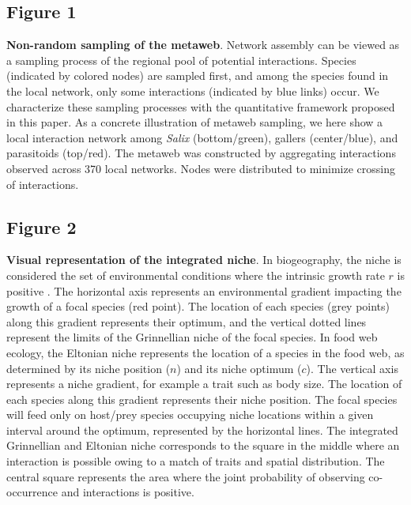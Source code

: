 \documentclass[12pt]{article}
\begin{document}
\subsection*{Figure 1}

\textbf{Non-random sampling of the metaweb}. Network assembly can be viewed
as a sampling process of the regional pool of potential interactions. Species
(indicated by colored nodes) are sampled first, and among the species found in
the local network, only some interactions (indicated by blue links) occur.
We characterize these sampling processes with the quantitative framework
proposed in this paper. As a concrete illustration of metaweb sampling, we
here show a local interaction network among \textit{Salix} (bottom/green), gallers
(center/blue), and parasitoids (top/red). The metaweb was constructed by
aggregating interactions observed across 370 local networks. Nodes were distributed 
to minimize crossing of interactions.

\subsection*{Figure 2}

\textbf{Visual representation of the integrated niche}. In biogeography, the
niche is considered the set of environmental conditions where the intrinsic
growth rate $r$ is positive \citep{Holt2009a}. The horizontal axis represents
an environmental gradient impacting the growth of a focal species (red point).
The location of each species (grey points) along this gradient represents their
optimum, and the vertical dotted lines represent the limits of the Grinnellian
niche of the focal species. In food web ecology, the Eltonian niche represents
the location of a species in the food web, as determined by its niche position
($n$) and its niche optimum ($c$). The vertical axis represents a niche
gradient, for example a trait such as body size. The location of each species
along this gradient represents their niche position. The focal species will
feed only on host/prey species occupying niche locations within a given interval
around the optimum, represented by the horizontal lines. The integrated
Grinnellian and Eltonian niche corresponds to the square in the middle where
an interaction is possible owing to a match of traits and spatial
distribution. The central square represents the area where the joint
probability of observing co-occurrence and interactions is positive.
\end{document}
